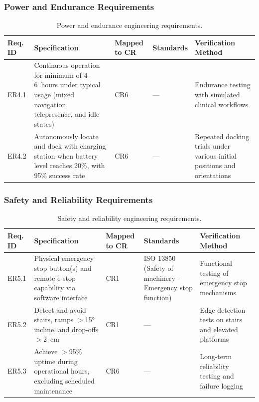 \subsubsection{Power and Endurance Requirements}

\begin{table}[H]
\centering
\small
\begin{tabularx}{\linewidth}{|l|>{\raggedright\arraybackslash}X|l|>{\raggedright\arraybackslash}X|>{\raggedright\arraybackslash}X|}
\hline
\textbf{Req. ID} & \textbf{Specification} & \textbf{Mapped to CR} & \textbf{Standards} & \textbf{Verification Method} \\
\hline
ER4.1 & Continuous operation for minimum of 4--6~hours under typical usage (mixed navigation, telepresence, and idle states) & CR6 & --- & Endurance testing with simulated clinical workflows \\
\hline
ER4.2 & Autonomously locate and dock with charging station when battery level reaches 20\%, with 95\% success rate & CR6 & --- & Repeated docking trials under various initial positions and orientations \\
\hline
\end{tabularx}
\caption{Power and endurance engineering requirements.}
\label{tab:er_power}
\end{table}

\subsubsection{Safety and Reliability Requirements}

\begin{table}[H]
\centering
\small
\begin{tabularx}{\linewidth}{|l|>{\raggedright\arraybackslash}X|l|>{\raggedright\arraybackslash}X|>{\raggedright\arraybackslash}X|}
\hline
\textbf{Req. ID} & \textbf{Specification} & \textbf{Mapped to CR} & \textbf{Standards} & \textbf{Verification Method} \\
\hline
ER5.1 & Physical emergency stop button(s) and remote e-stop capability via software interface & CR1 & ISO 13850 \cite{iso13850} (Safety of machinery - Emergency stop function) & Functional testing of emergency stop mechanisms \\
\hline
ER5.2 & Detect and avoid stairs, ramps $>$15° incline, and drop-offs $>$2~cm & CR1 & --- & Edge detection tests on stairs and elevated platforms \\
\hline
ER5.3 & Achieve $>$95\% uptime during operational hours, excluding scheduled maintenance & CR6 & --- & Long-term reliability testing and failure logging \\
\hline
\end{tabularx}
\caption{Safety and reliability engineering requirements.}
\label{tab:er_safety}
\end{table}

